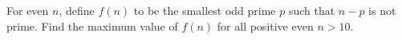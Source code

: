 For even $n$, define $f(n)$ to be the smallest odd prime $p$ such that $n-p$ is not prime. Find the maximum value of $f(n)$ for all positive even $n>10$.
